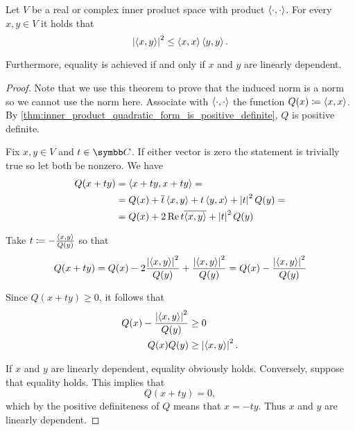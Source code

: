 \begin{theorem}\label{thm:cauchy_bunyakovsky_schwarz_inequality}
  Let \( V \) be a real or complex inner product space with product \( \left\langle \cdot, \cdot \right\rangle \). For every \( x, y \in V \) it holds that
  \begin{equation}\label{thm:cauchy_bunyakovsky_schwarz_inequality/inequality}
    {\left\vert \left\langle x, y \right\rangle \right\vert}^2 \leq \left\langle x, x \right\rangle \left\langle y, y \right\rangle.
  \end{equation}

  Furthermore, equality is achieved if and only if \( x \) and \( y \) are linearly dependent.
\end{theorem}
\begin{proof}
  Note that we use this theorem to prove that the induced norm is a norm so we cannot use the norm here. Associate with \( \left\langle \cdot, \cdot \right\rangle \) the function \( Q(x) \coloneqq \left\langle x, x \right\rangle \). By \cref{thm:inner_product_quadratic_form_is_positive_definite}, \( Q \) is positive definite.

  Fix \( x, y \in V \) and \( t \in \BB{C} \). If either vector is zero the statement is trivially true so let both be nonzero. We have
  \begin{align*}
    Q(x + ty)
    &=
    \left\langle x + ty, x + ty \right\rangle
    = \\ &=
    Q(x) + \overline{t} \left\langle x, y \right\rangle + t \left\langle y, x \right\rangle + \left\vert t \right\vert^2 Q(y)
    = \\ &=
    Q(x) + 2\operatorname{Re} t \overline{\left\langle x, y \right\rangle} + \left\vert t \right\vert^2 Q(y)
  \end{align*}

  Take \( t \coloneqq - \frac {\left\langle x, y \right\rangle} {Q(y)} \) so that
  \begin{equation*}
    Q(x + ty)
    =
    Q(x) - 2 \frac {\left\vert \left\langle x, y \right\rangle \right\vert^2} {Q(y)} + \frac {\left\vert \left\langle x, y \right\rangle \right\vert^2} {Q(y)}
    =
    Q(x) - \frac {\left\vert \left\langle x, y \right\rangle \right\vert^2} {Q(y)}
  \end{equation*}

  Since \( Q(x + ty) \geq 0 \), it follows that
  \begin{align*}
    Q(x) - \frac {\left\vert \left\langle x, y \right\rangle \right\vert^2} {Q(y)} &\geq 0 \\
    Q(x) Q(y) &\geq \left\vert \left\langle x, y \right\rangle \right\vert^2.
  \end{align*}

  If \( x \) and \( y \) are linearly dependent, equality obviously holds. Conversely, suppose that equality holds. This implies that
  \begin{equation*}
    Q(x + ty) = 0,
  \end{equation*}
  which by the positive definiteness of \( Q \) means that \( x = -ty \). Thus \( x \) and \( y \) are linearly dependent.
\end{proof}

